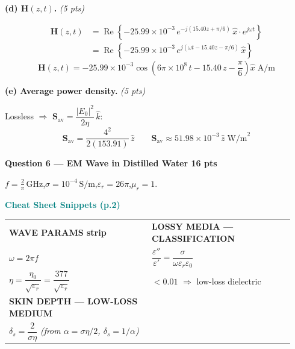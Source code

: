 \documentclass[11pt,letterpaper]{article}
\begin{document}
\textbf{(d) $\mathbf{H}(z,t)$.} \hfill\textit{(5 pts)}

\begin{align*}
\mathbf{H}(z,t)
&=\operatorname{Re}\!\left\{-25.99\times10^{-3}\,e^{-j(15.40z+\pi/6)}\,\hat{x}\cdot e^{j\omega t}\right\}\\
&=\operatorname{Re}\!\left\{-25.99\times10^{-3}\,e^{j(\omega t-15.40z-\pi/6)}\,\hat{x}\right\}
\end{align*}
\[
\boxed{\mathbf{H}(z,t)=-25.99\times10^{-3}\cos\!\left(6\pi\times10^8\,t-15.40\,z-\frac{\pi}{6}\right)\hat{x}\;\text{A/m}}
\]

\textbf{(e) Average power density.} \hfill\textit{(5 pts)}

Lossless $\Rightarrow$ $\mathbf{S}_\text{av}=\dfrac{|E_0|^2}{2\eta}\,\hat{k}$:
\[
\mathbf{S}_\text{av}=\frac{4^2}{2(153.91)}\,\hat{z}
\qquad
\boxed{\mathbf{S}_\text{av}\approx51.98\times10^{-3}\,\hat{z}\;\text{W/m}^2}
\]

\newpage
\colorbox{coralbg}{\parbox{\dimexpr\linewidth-2\fboxsep}{\color{coral}\large\textbf{Question 6 --- EM Wave in Distilled Water \hfill 16 pts}}}

\vspace{4pt}
$f=\tfrac{2}{\pi}\,\text{GHz}$,\quad $\sigma=10^{-4}\,\text{S/m}$,\quad $\varepsilon_r=26\pi$,\quad $\mu_r=1$.

\begin{cssnip}
\textbf{\small\textcolor{teal}{Cheat Sheet Snippets (p.2)}}\\[3pt]
\begin{tabular}{@{}p{0.47\linewidth}p{0.47\linewidth}@{}}
\textbf{WAVE PARAMS strip} & \textbf{LOSSY MEDIA --- CLASSIFICATION}\\
$\omega=2\pi f$ &
$\dfrac{\varepsilon''}{\varepsilon'}=\dfrac{\sigma}{\omega\varepsilon_r\varepsilon_0}$\\[3pt]
$\eta=\dfrac{\eta_0}{\sqrt{\varepsilon_r}}=\dfrac{377}{\sqrt{\varepsilon_r}}$ &
$<0.01$ $\Rightarrow$ low-loss dielectric\\[5pt]
\textbf{SKIN DEPTH --- LOW-LOSS MEDIUM} & \\
$\delta_s=\dfrac{2}{\sigma\eta}$ \quad\textit{(from $\alpha=\sigma\eta/2$, $\delta_s=1/\alpha$)} & \\
\end{tabular}
\end{cssnip}
\end{document}
